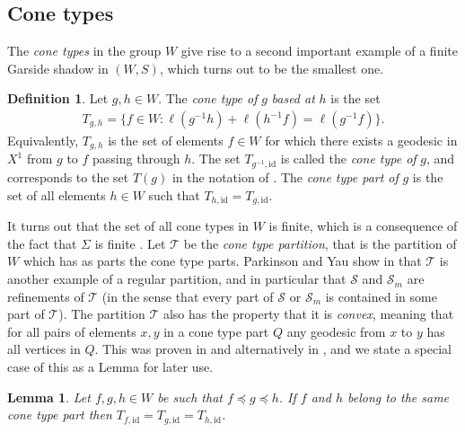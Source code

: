 \documentclass[a4paper,12pt,leqno]{amsart}
\newtheorem{lemma}[theorem]{Lemma}
\theoremstyle{definition}
\newtheorem{defin}[theorem]{Definition}
\newcommand{\id}{\text{id}}
\begin{document}
\subsection{Cone types} \label{subsection cone types}

The \emph{cone types} in the group $W$ give rise to a second important example of a finite Garside shadow in $(W,S)$, which turns out to be the smallest one. 

\begin{defin}
    Let $g, h \in W$. The \emph{cone type of} $g$ \emph{based at} $h$ is the set
    \begin{align*}
        T_{g,h} = \{f \in W : \ell(g^{-1}h) + \ell(h^{-1}f) = \ell(g^{-1}f)\}.
    \end{align*}
    Equivalently, $T_{g,h}$ is the set of elements $f \in W$ for which there exists a geodesic in $X^1$ from $g$ to $f$ passing through $h$. The set $T_{g^{-1}, \id}$ is called the \emph{cone type of} $g$, and corresponds to the set $T(g)$ in the notation of \cite{PaY-reg}. The \emph{cone type part of} $g$ is the set of all elements $h \in W$ such that $T_{h, \id} = T_{g, \id}$. 
\end{defin}

It turns out that the set of all cone types in $W$ is finite, which is a consequence of the fact that $\Sigma$ is finite \cite[Cor 2.10]{PaY-reg}. Let $\mathscr{T}$ be the \emph{cone type partition}, that is the partition of $W$ which has as parts the cone type parts. Parkinson and Yau show in \cite{PaY-reg} that $\mathscr{T}$ is another example of a regular partition, and in particular that $\mathscr{S}$ and $\mathscr{S}_m$ are refinements of $\mathscr{T}$ (in the sense that every part of $\mathscr{S}$ or $\mathscr{S}_m$ is contained in some part of $\mathscr{T}$). The partition $\mathscr{T}$ also has the property that it is \emph{convex}, meaning that for all pairs of elements $x,y$ in a cone type part $Q$ any geodesic from $x$ to $y$ has all vertices in $Q$. This was proven in \cite[Prop 4.3]{PaY-reg} and alternatively in \cite[Rem 3.1]{PrY-pair}, and we state a special case of this as a Lemma for later use.

\begin{lemma} \label{lem-convex}
    Let $f,g,h \in W$ be such that $f \preceq g \preceq h$. If $f$ and $h$ belong to the same cone type part then $T_{f, \id} = T_{g, \id} = T_{h, \id}$.
\end{lemma}
\end{document}
